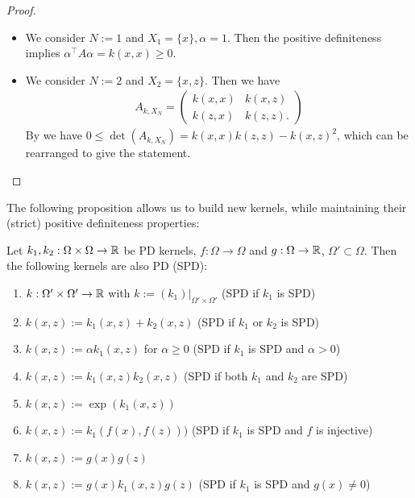 \begin{proof}
\begin{itemize}
\item We consider $N := 1$ and $X_1 = \{ x\}, \alpha = 1$. 
Then the positive definiteness implies $\alpha^\top A \alpha = k(x, x) \geq 0$.
\item We consider $N := 2$ and $X_2 = \{ x, z \}$. 
Then we have
\begin{align*}
A_{k, X_N} = \begin{pmatrix}
k(x, x) & k(x, z) \\
k(z, x) & k(z, z).
\end{pmatrix}
\end{align*}
By  we have $0 \leq \det(A_{k, X_N}) = k(x, x) k(z, z) - k(x, z)^2$, which can be rearranged to give the statement.
\end{itemize}
\end{proof}

The following proposition allows us to build new kernels, while maintaining their (strict) positive definiteness properties:

\begin{prop}
\label{prop:build_kernels}
Let $k_1, k_2: \Omega \times \Omega \rightarrow \mathbb{R}$ be PD kernels,
$f: \Omega \rightarrow \Omega$ and $g: \Omega \rightarrow \mathbb{R}$, $\Omega' \subset \Omega$. 
Then the following kernels are also PD (SPD):
\begin{enumerate}
\item $k: \Omega' \times \Omega' \rightarrow \mathbb{R}$ with $k := (k_1)|_{\Omega' \times \Omega'}$ \hfill (SPD if $k_1$ is SPD)
\item $k(x, z) := k_1(x, z) + k_2(x, z)$ \hfill (SPD if $k_1$ or $k_2$ is SPD)
\item $k(x, z) := \alpha k_1(x, z)$ for $\alpha \geq 0$ \hfill (SPD if $k_1$ is SPD and $\alpha > 0$)
\item $k(x, z) := k_1(x, z) k_2(x, z)$ \hfill (SPD if both $k_1$ and $k_2$ are SPD)
\item $k(x, z) := \exp(k_1(x, z))$ 
\item $k(x, z) := k_1(f(x), f(z)))$ \hfill (SPD if $k_1$ is SPD and $f$ is injective)
\item $k(x, z) := g(x)g(z)$
\item $k(x, z) := g(x)k_1(x, z)g(z)$ \hfill (SPD if $k_1$ is SPD and $g(x) \neq 0$)
\end{enumerate}

\end{prop}

